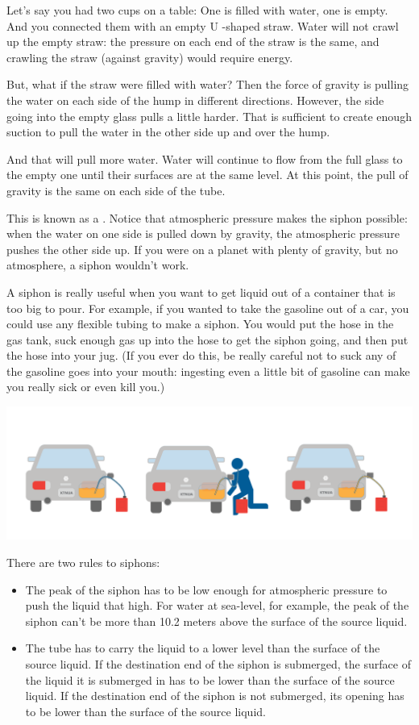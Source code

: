 Let's say you had two cups on a table: One is filled with water,  one is empty.  And you connected them with an empty U -shaped straw.  Water will not crawl up the empty straw:  the pressure on each end of the straw is the same, and crawling the straw (against gravity) would require energy.

But, what if the straw were filled with water?  Then the force of gravity is pulling the water on each side of the hump in different directions.   However,  the side going into the empty glass pulls a little harder.  That is sufficient to create enough suction to pull the  water in the other side up and over the hump.

And that will pull more water.    Water will continue to flow from the full glass to the empty one until their surfaces are at the same level.  At this point,  the pull of gravity is the same on each side of the tube.

This is known as a .   Notice that atmospheric pressure makes the siphon possible:  when the water on one side is pulled down by gravity,  the atmospheric pressure pushes the other side up.  If you were on a planet with plenty of gravity,  but no atmosphere,  a siphon wouldn't work.

A siphon is really useful when you want to get liquid out of a container that is too big to pour.   For 
example, if you wanted to take the gasoline out of a car,  you could use any flexible tubing to make a siphon.  You would put the hose in the gas tank,  suck enough gas up into the hose to get the siphon going,  and then put the hose into your jug.  (If you ever do this,  be really careful not to suck any of the gasoline goes into your mouth: ingesting even a little bit of gasoline can make you really sick or even kill you.)

\includegraphics[width=\textwidth]{siphon.png}


There are two rules to siphons:
\begin{itemize}
\item The peak of the siphon has to be low enough for atmospheric pressure to push the liquid that high.  For water at sea-level, for example,  the peak of the siphon can't be more than 10.2 meters above the surface of the source liquid. 

\item  The tube has to carry the liquid to a lower level than the surface of the source liquid.   If the destination end of the siphon is submerged,  the surface of the liquid it is submerged in has to be lower than the surface of the source liquid.  If the destination end of the siphon is not submerged,  its opening has to be lower than the surface of the source liquid.
\end{itemize}

